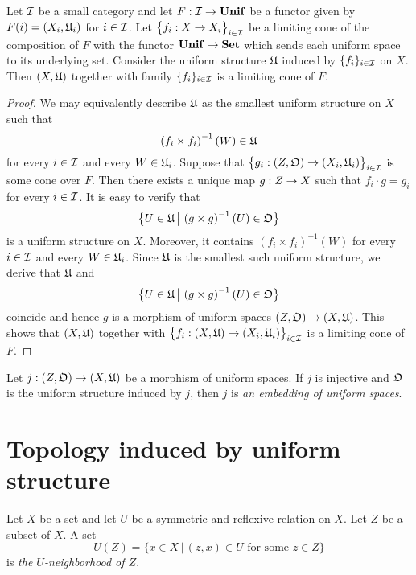 \begin{theorem}\label{theorem:limits_of_uniform_spaces_description}
Let ${\mathcal I}$ be a small category and let $F:{\mathcal I}\rightarrow \mathbf{Unif}$ be a functor given by $F(i) = (X_i,{\mathfrak U}_i)$ for $i\in {\mathcal I}$. Let $\big\{f_i:X \rightarrow X_i \big\}_{i\in {\mathcal I}}$ be a limiting cone of the composition of $F$ with the functor $\mathbf{Unif} \rightarrow \mathbf{Set}$ which sends each uniform space to its underlying set. Consider the uniform structure ${\mathfrak U}$ induced by $\{f_i\}_{i \in {\mathcal I}}$ on $X$. Then $(X,{\mathfrak U})$ together with family $\{f_i\}_{i\in {\mathcal I}}$ is a limiting cone of $F$.
\end{theorem}
\begin{proof}
We may equivalently describe ${\mathfrak U}$ as the smallest uniform structure on $X$ such that 
$$\left(f_i\times f_i\right)^{-1}(W) \in {\mathfrak U}$$
for every $i\in {\mathcal I}$ and every $W \in {\mathfrak U}_i$. Suppose that $\big\{g_i:(Z,{\mathfrak O}) \rightarrow (X_i,{\mathfrak U}_i)\big\}_{i\in {\mathcal I}}$ is some cone over $F$. Then there exists a unique map $g:Z \rightarrow X$ such that $f_i \cdot g = g_i$ for every $i\in {\mathcal I}$. It is easy to verify that
$$\big\{U\in {\mathfrak U}\,\big|\,\left(g\times g\right)^{-1}(U)\in {\mathfrak O}\big\}$$
is a uniform structure on $X$. Moreover, it contains $\left(f_i\times f_i\right)^{-1}(W)$ for every $i\in {\mathcal I}$ and every $W \in {\mathfrak U}_i$. Since ${\mathfrak U}$ is the smallest such uniform structure, we derive that ${\mathfrak U}$ and
$$\big\{U \in {\mathfrak U}\,\big|\,\left(g\times g\right)^{-1}(U) \in {\mathfrak O}\big\}$$
coincide and hence $g$ is a morphism of uniform spaces $\left(Z,{\mathfrak O}\right) \rightarrow \left(X,{\mathfrak U}\right)$. This shows that $(X,{\mathfrak U})$ together with $\big\{f_i:(X,{\mathfrak U}) \rightarrow (X_i,{\mathfrak U}_i)\big\}_{i\in {\mathcal I}}$ is a limiting cone of $F$.
\end{proof}

\begin{definition}
Let $j:\left(Z,{\mathfrak O}\right)\rightarrow \left(X,{\mathfrak U}\right)$ be a morphism of uniform spaces. If $j$ is injective and ${\mathfrak O}$ is the uniform structure induced by $j$, then $j$ is \textit{an embedding of uniform spaces}.
\end{definition}

\section{Topology induced by uniform structure}

\begin{definition}
Let $X$ be a set and let $U$ be a symmetric and reflexive relation on $X$. Let $Z$ be a subset of $X$. A set
$$U(Z) = \big\{x\in X\,\big|\,(z,x) \in U\mbox{ for some }z\in Z\big\}$$
is \textit{the $U$-neighborhood of $Z$}. 
\end{definition}

